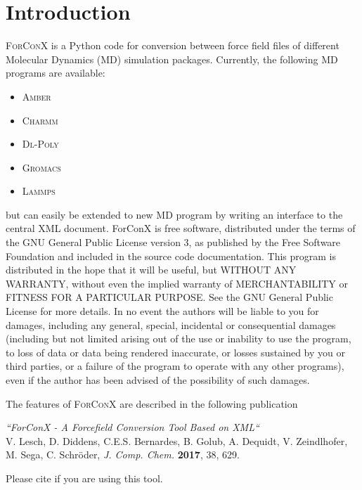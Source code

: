 \documentclass[12pt]{article}
\newcommand{\AMBER}{\textsc{Amber}}
\newcommand{\CHARMM}{\textsc{Charmm}}
\newcommand{\DLPOLY}{\textsc{Dl-Poly}}
\newcommand{\GROMACS}{\textsc{Gromacs}}
\newcommand{\LAMMPS}{\textsc{Lammps}}
\begin{document}
\section{Introduction}
\textsc{ForConX} is a Python code for conversion between force field files of
different Molecular Dynamics (MD) simulation packages. Currently, the following MD programs
are available:
\begin{itemize}
\item \AMBER
\item \CHARMM
\item \DLPOLY
\item \GROMACS
\item \LAMMPS
\end{itemize}
but can easily be extended to new MD program by writing an interface to the central
XML document. ForConX is free software, distributed under the terms of the GNU General Public License version 3, 
as published by the Free Software Foundation and included in the source code documentation. 
This program is distributed in the hope that it will be useful, but WITHOUT ANY WARRANTY, without even the implied warranty of 
MERCHANTABILITY or FITNESS FOR A PARTICULAR PURPOSE. See the GNU General Public License for more details.  
In no event the authors will be liable to you for damages, including any general, special, incidental or consequential damages 
(including but not limited arising out of the use or inability to use the program, to loss of data or data being rendered inaccurate, 
or losses sustained by you or third parties, or a failure of the program to operate with any other programs),
even if the author has been advised of the possibility of such damages.

The features of \textsc{ForConX} are described in the following publication
\begin{mdframed}[backgroundcolor=gray!40]
\textit{``ForConX - A Forcefield Conversion Tool Based on XML``}\\
V. Lesch, D. Diddens, C.E.S. Bernardes, B. Golub, A. Dequidt, V. Zeindlhofer, \\
M. Sega, C. Schr\"oder, \textit{J. Comp. Chem.} \textbf{2017}, 38, 629.
\end{mdframed}
Please cite if you are using this tool.
\clearpage{}
\end{document}
